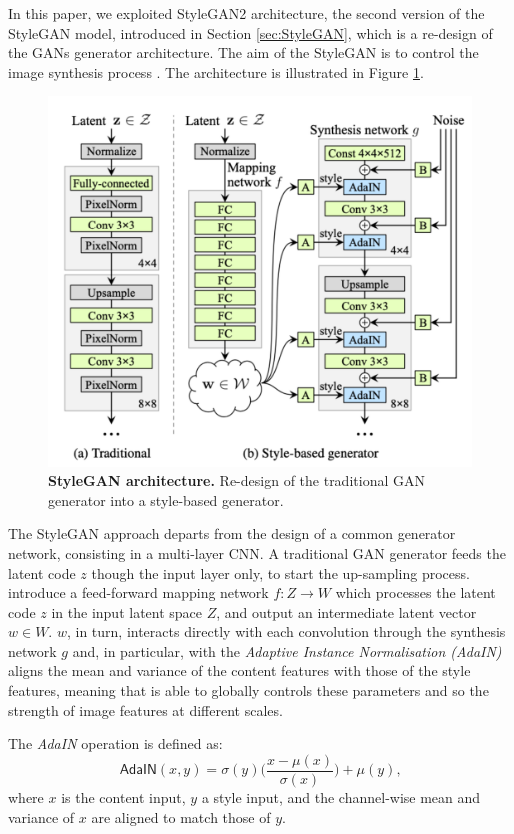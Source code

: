 \documentclass{article}
\begin{document}
	In this paper, we exploited StyleGAN2 architecture, the second version of the StyleGAN model, 
	introduced in Section \ref{sec:StyleGAN}, which is a re-design of the GANs generator architecture.
	The aim of the StyleGAN is to control the image synthesis process \cite{karras2019style}. The 
	architecture is illustrated in Figure \ref{fig:StyleGAN}.
	\begin{figure}[!h]				
		\centering
		\includegraphics[width=.5\linewidth]{images/StyleGAN}
		\caption{\textbf{StyleGAN architecture.} Re-design of the traditional GAN generator into a 
			style-based generator.}
		\label{fig:StyleGAN}
	\end{figure}
	
	The StyleGAN approach departs from the design of a common generator network, consisting in a 
	multi-layer CNN.
	A traditional GAN generator feeds the latent code $z$ though the input layer only, to start the 
	up-sampling process.
	\citet{karras2019style} introduce a feed-forward mapping network $f : Z \rightarrow W$ which 
	processes the latent code $z$ in the input latent space $Z$, and output an intermediate latent 
	vector $w \in W$. 
	$w$, in turn, interacts directly with each convolution through the synthesis network  $g$ and, in 
	particular, with the \textit{Adaptive Instance Normalisation (AdaIN)} \cite{huang2017arbitrary} aligns 
	the mean and variance of the content features with those of the style features, meaning that is able 
	to globally controls these parameters and so the strength of image features at different scales. 
	
	The \textit{AdaIN} operation is defined as:
	\begin{equation}
		\label{e:adain}
		\mathsf{AdaIN}(x, y) = \sigma(y) \bigg(\frac{x - \mu(x)}{\sigma (x)} \bigg) + \mu (y) \mbox{,}
	\end{equation}
	where $x$ is the content input, $y$ a style input, and the channel-wise mean and variance of $x$ 
	are aligned to match those of $y$.
	
\end{document}
